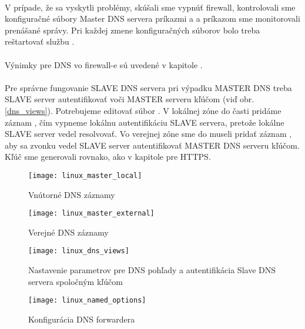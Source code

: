 \paragraph{}
V prípade, že sa vyskytli problémy, skúšali sme vypnúť firewall, kontrolovali sme konfiguračné súbory Master DNS servera príkazmi  a  a príkazom  sme monitorovali prenášané správy. Pri každej zmene konfiguračných súborov bolo treba reštartovať službu .

\paragraph{}
Výnimky pre DNS vo firewall-e sú uvedené v kapitole .

\paragraph{}
Pre správne fungovanie SLAVE DNS servera pri výpadku MASTER DNS treba SLAVE server autentifikovať voči MASTER serveru kľúčom (viď obr. \ref{dns_views}). Potrebujeme editovať súbor . V lokálnej zóne do časti  pridáme záznam , čím vypneme lokálnu autentifikáciu SLAVE servera, pretože lokálne SLAVE server vedel resolvovať. Vo verejnej zóne sme do  museli pridať záznam , aby sa zvonku vedel SLAVE server autentifikovať MASTER DNS serveru kľúčom. Kľúč sme generovali rovnako, ako v kapitole  pre HTTPS.

\begin{figure}[!htb]
\centering
\texttt{[image: linux\_master\_local]}
\caption{Vnútorné DNS záznamy}
\label{fig:dns_internal}
\end{figure}

\begin{figure}[!htb]
\centering
\texttt{[image: linux\_master\_external]}
\caption{Verejné DNS záznamy}
\label{fig:dns_external}
\end{figure}

\begin{figure}[!htb]
\centering
\texttt{[image: linux\_dns\_views]}
\caption{Nastavenie parametrov pre DNS pohľady a autentifikácia Slave DNS servera spoločným kľúčom}
\label{fig:dns_views}
\end{figure}

\begin{figure}[!htb]
\centering
\texttt{[image: linux\_named\_options]}
\caption{Konfigurácia DNS forwardera}
\label{fig:dns_forwarder}
\end{figure}


